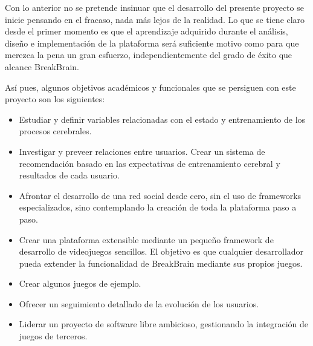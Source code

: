 Con lo anterior no se pretende insinuar que el desarrollo del presente proyecto se inicie pensando en el fracaso, nada más lejos de la realidad. Lo que se tiene claro desde el primer momento es que el aprendizaje adquirido durante el análisis, diseño e implementación de la plataforma será suficiente motivo como para que merezca la pena un gran esfuerzo, independientemente del grado de éxito que alcance BreakBrain.

Así pues, algunos objetivos académicos y funcionales que se persiguen con este proyecto son los siguientes:

\begin{itemize}
\item Estudiar y definir variables relacionadas con el estado y entrenamiento de los procesos cerebrales.
\item Investigar y preveer relaciones entre usuarios. Crear un sistema de recomendación basado en las expectativas de entrenamiento cerebral y resultados de cada usuario.
\item Afrontar el desarrollo de una red social desde cero, sin el uso de frameworks especializados, sino contemplando la creación de toda la plataforma paso a paso.
\item Crear una plataforma extensible mediante un pequeño framework de desarrollo de videojuegos sencillos. El objetivo es que cualquier desarrollador pueda extender la funcionalidad de BreakBrain mediante sus propios juegos.
\item Crear algunos juegos de ejemplo.
\item Ofrecer un seguimiento detallado de la evolución de los usuarios.
\item Liderar un proyecto de software libre ambicioso, gestionando la integración de juegos de terceros.
\end{itemize}



